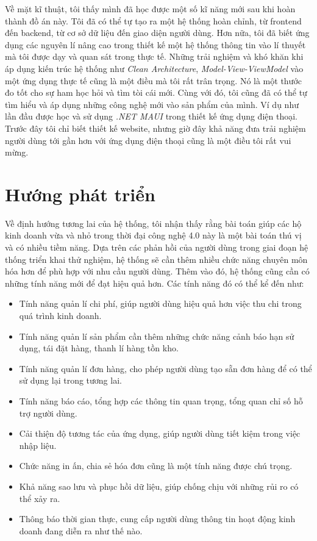 \documentclass[../DoAn.tex]{subfiles}
\begin{document}
Về mặt kĩ thuật, tôi thấy mình đã học được một số kĩ năng mới sau khi hoàn thành đồ án này. Tôi đã có thể tự tạo ra một hệ thống hoàn chỉnh, từ frontend đến backend, từ cơ sở dữ liệu đến giao diện người dùng. Hơn nữa, tôi đã biết ứng dụng các nguyên lí nâng cao trong thiết kế một hệ thống thông tin vào lí thuyết mà tôi được dạy và quan sát trong thực tế. Những trải nghiệm và khó khăn khi áp dụng kiến trúc hệ thống như \textit{Clean Architecture}, \textit{Model-View-ViewModel} vào một ứng dụng thực tế cũng là một điều mà tôi rất trân trọng. Nó là một thước đo tốt cho sự ham học hỏi và tìm tòi cái mới. Cùng với đó, tôi cũng đã có thể tự tìm hiểu và áp dụng những công nghệ mới vào sản phẩm của mình. Ví dụ như lần đầu được học và sử dụng \textit{.NET MAUI} trong thiết kế ứng dụng điện thoại. Trước đây tôi chỉ biết thiết kế website, nhưng giờ đây khả năng đưa trải nghiệm người dùng tới gần hơn với ứng dụng điện thoại cũng là một điều tôi rất vui mừng.


\section{Hướng phát triển}

Về định hướng tương lai của hệ thống, tôi nhận thấy rằng bài toán giúp các hộ kinh doanh vừa và nhỏ trong thời đại công nghệ 4.0 này là một bài toán thú vị và có nhiều tiềm năng. Dựa trên các phản hồi của người dùng trong giai đoạn hệ thống triển khai thử nghiệm, hệ thống sẽ cần thêm nhiều chức năng chuyên môn hóa hơn để phù hợp với nhu cầu người dùng. Thêm vào đó, hệ thống cũng cần có những tính năng mới để đạt hiệu quả hơn. Các tính năng đó có thể kể đến như:
\begin{itemize}
    \item Tính năng quản lí chi phí, giúp người dùng hiệu quả hơn việc thu chi trong quá trình kinh doanh.
    \item Tính năng quản lí sản phẩm cần thêm những chức năng cảnh báo hạn sử dụng, tái đặt hàng, thanh lí hàng tồn kho.
    \item Tính năng quản lí đơn hàng, cho phép người dùng tạo sẵn đơn hàng để có thể sử dụng lại trong tương lai.
    \item Tính năng báo cáo, tổng hợp các thông tin quan trọng, tổng quan chỉ số hỗ trợ người dùng.
    \item Cải thiện độ tương tác của ứng dụng, giúp người dùng tiết kiệm trong việc nhập liệu.
    \item Chức năng in ấn, chia sẻ hóa đơn cũng là một tính năng được chú trọng.
    \item Khả năng sao lưu và phục hồi dữ liệu, giúp chống chịu với những rủi ro có thể xảy ra.
    \item Thông báo thời gian thực, cung cấp người dùng thông tin hoạt động kinh doanh đang diễn ra như thế nào.
\end{itemize}
\vfill
\break
\end{document}
